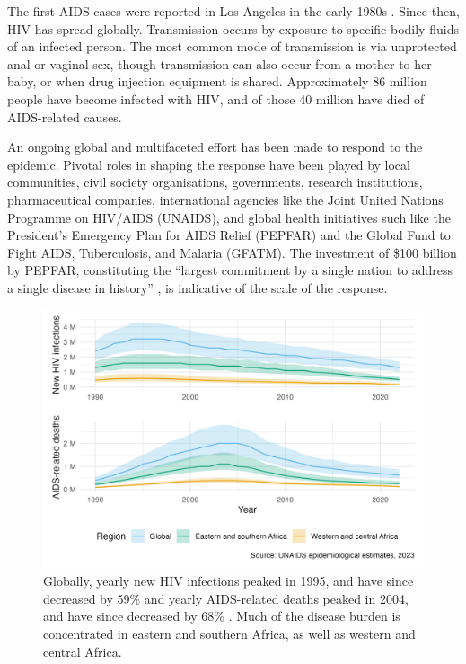 \documentclass[a4paper, nobind]{templates/ociamthesis}
\begin{document}
The first AIDS cases were reported in Los Angeles in the early 1980s \autocite{gottlieb1981pneumocystis,barre1983isolation}.
Since then, HIV has spread globally.
Transmission occurs by exposure to specific bodily fluids of an infected person.
The most common mode of transmission is via unprotected anal or vaginal sex, though transmission can also occur from a mother to her baby, or when drug injection equipment is shared.
Approximately 86 million people have become infected with HIV, and of those 40 million have died of AIDS-related causes.

An ongoing global and multifaceted effort has been made to respond to the epidemic.
Pivotal roles in shaping the response have been played by local communities, civil society organisations, governments, research institutions, pharmaceutical companies, international agencies like the Joint United Nations Programme on HIV/AIDS (UNAIDS), and global health initiatives such like the President's Emergency Plan for AIDS Relief (PEPFAR) and the Global Fund to Fight AIDS, Tuberculosis, and Malaria (GFATM).
The investment of \$100 billion by PEPFAR, constituting the ``largest commitment by a single nation to address a single disease in history'' \autocite{pepfar2022}, is indicative of the scale of the response.



\begin{figure}

{\centering \includegraphics[width=0.95\linewidth]{figures/hiv-aids/overall-picture} 

}

\caption{Globally, yearly new HIV infections peaked in 1995, and have since decreased by 59\% and yearly AIDS-related deaths peaked in 2004, and have since decreased by 68\% \autocite{unaids2023aidsinfo}. Much of the disease burden is concentrated in eastern and southern Africa, as well as western and central Africa.}\label{fig:overall-picture}
\end{figure}
\end{document}
